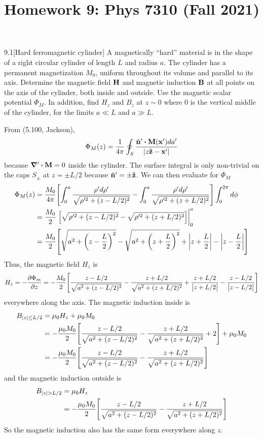 \documentclass[12pt]{article}
\title{Homework 9: Phys 7310 (Fall 2021)}
\begin{document}
\maketitle
\begin{problem}{9.1}[Hard ferromagnetic cylinder]
A magnetically ``hard'' material is in the shape of a right circular cylinder of
length $L$ and radius $a$. The cylinder has a permanent magnetization $M_0$,
uniform throughout its volume and parallel to its axis. Determine the magnetic
field $\vb{H}$ and magnetic induction $\vb{B}$ at all points on the axis of the
cylinder, both inside and outside. Use the magnetic scalar potential $\Phi_M$.
In addition, find $H_z$ and $B_z$ at $z\sim 0$ where $0$ is the vertical middle
of the cylinder, for the limits $a\ll L$ and $a\gg L$.
\begin{solution}
From (5.100, Jackson),
\begin{equation}
    \Phi_M(z)=\frac1{4\pi}\oint_S\frac{\hat{\vb{n}}'\vdot\vb{M}(\vb{x}')da'}{\abs{z\zhat-\vb{x}'}}
\end{equation}
because $\grad'\vdot\vb{M}=0$ inside the cylinder. The surface integral is only
non-trivial on the caps $S_\pm$ at $z=\pm L /2$ because
$\hat{\vb{n}}'=\pm\vb{\hat{z}}$. We can then evaluate for $\Phi_M$
\begin{align}
    \Phi_M(z)
    &=\frac{M_0}{4\pi}\qty[\int_0^a\frac{\rho'd\rho'}{\sqrt{\rho'^2+(z-L/2)^2}}-\int_0^a\frac{\rho'd\rho'}{\sqrt{\rho'^2+(z+L/2)^2}}]\int_0^{2\pi}
    d\phi\notag\\
    &=\frac{M_0}{2}\eval{\qty[\sqrt{\rho'^2+(z-L/2)^2}-\sqrt{\rho'^2+(z+L/2)^2}]}_0^a\notag\\
    &=\frac{M_0}{2}\qty[\sqrt{a^2+\qty(z-\frac{L}{2})^2}-\sqrt{a^2+\qty(z+\frac{L}{2})^2}+\abs{z+\frac{L}{2}}-\abs{z-\frac{L}{2}}]
\end{align}
Thus, the magnetic field $H_z$ is
\begin{equation}\label{p1:H}
    H_z=-\frac{\partial\Phi_m}{\partial z}
    =-\frac{M_0}{2}\qty[\frac{z-L/2}{\sqrt{a^2+(z-L/2)^2}}
    -\frac{z+L/2}{\sqrt{a^2+(z+L/2)^2}}+\frac{z+L/2}{\abs{z+L/2}}-\frac{z-L/2}{\abs{z-L/2}}]
\end{equation}
everywhere along the axis. The magnetic induction inside is
\begin{align}
    B_{\abs{z}\leq L/2}
    &=\mu_0H_z+\mu_0M_0\notag\\
    &=-\frac{\mu_0M_0}{2}\qty[\frac{z-L/2}{\sqrt{a^2+(z-L/2)^2}}
    -\frac{z+L/2}{\sqrt{a^2+(z+L/2)^2}}+2]+\mu_0M_0\notag\\
    &=-\frac{\mu_0M_0}{2}\qty[\frac{z-L/2}{\sqrt{a^2+(z-L/2)^2}}-\frac{z+L/2}{\sqrt{a^2+(z+L/2)^2}}]
\end{align}
and the magnetic induction outside is
\begin{align}\label{p1:B}
    B_{\abs{z}>L/2}
    &=\mu_0H_z\notag\\
    &=-\frac{\mu_0M_0}{2}\qty[\frac{z-L/2}{\sqrt{a^2+(z-L/2)^2}}-\frac{z+L/2}{\sqrt{a^2+(z+L/2)^2}}]
\end{align}
So the magnetic induction also has the same form everywhere along $z$.


\end{solution}
\end{problem}
\end{document}
